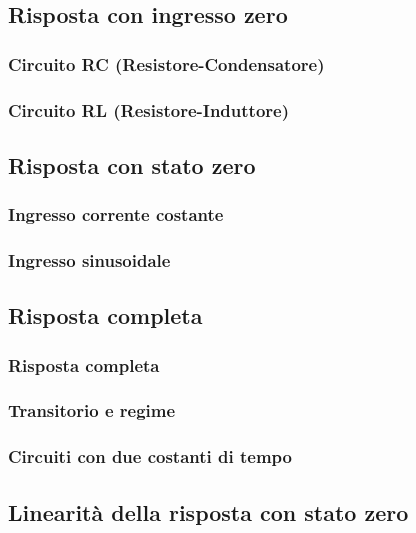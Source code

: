 \documentclass[a4paper,12pt]{article}
\theoremstyle{mystyle}
\begin{document}
\subsection{Risposta con ingresso zero}
\subsubsection{Circuito RC (Resistore-Condensatore)}


\subsubsection{Circuito RL (Resistore-Induttore)}

\subsection{Risposta con stato zero}

\subsubsection{Ingresso corrente costante}

\subsubsection{Ingresso sinusoidale}

\subsection{Risposta completa}

\subsubsection{Risposta completa}

\subsubsection{Transitorio e regime}

\subsubsection{Circuiti con due costanti di tempo}

\subsection{Linearità della risposta con stato zero}
\end{document}
